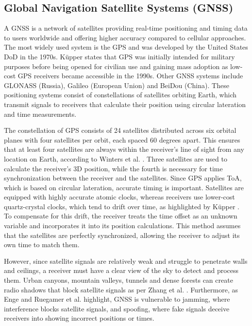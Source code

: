 \subsection{Global Navigation Satellite Systems (GNSS)}
\label{sec:gnss}
A \acs{GNSS} is a network of satellites providing real-time positioning and timing data to users worldwide and offering higher accuracy compared to cellular approaches.
The most widely used system is the \ac{GPS} and was developed by the United States \ac{DoD} in the 1970s.
K\"upper \cite{kupper2005location} states that \acs{GPS} was initially intended for military purposes before being opened for civilian use and gaining mass adoption as low-cost GPS receivers became accessible in the 1990s.
Other GNSS systems include GLONASS (Russia), Galileo (European Union) and BeiDou (China). 
These positioning systems consist of constellations of satellites orbiting Earth, which transmit signals to receivers that calculate their position using circular lateration and time measurements.

The constellation of \acs{GPS} consists of 24 satellites distributed across six orbital planes with four satellites per orbit, each spaced 60 degrees apart. 
This ensures that at least four satellites are always within the receiver's line of sight from any location on Earth, according to Winters et al. \cite{winters2008travel}.  
Three satellites are used to calculate the receiver's 3D position, while the fourth is necessary for time synchronization between the receiver and the satellites. 
Since \acs{GPS} applies \ac{ToA}, which is based on circular lateration, accurate timing is important. 
Satellites are equipped with highly accurate atomic clocks, whereas receivers use lower-cost quartz-crystal clocks, which tend to drift over time, as highlighted by K\"upper \cite{kupper2005location}. 
To compensate for this drift, the receiver treats the time offset as an unknown variable and incorporates it into its position calculations. 
This method assumes that the satellites are perfectly synchronized, allowing the receiver to adjust its own time to match them.  

However, since satellite signals are relatively weak and struggle to penetrate walls and ceilings, a receiver must have a clear view of the sky to detect and process them.
Urban canyons, mountain valleys, tunnels and dense forests can create radio shadows that block satellite signals as per Zhang et al. \cite{zhang2021gnss}. 
Furthermore, as Enge \cite{enge1994global} and Ruegamer et al. \cite{ruegamer2015jamming} highlight, \acs{GNSS} is vulnerable to jamming, where interference blocks satellite signals, and spoofing, where fake signals deceive receivers into showing incorrect positions or times.

